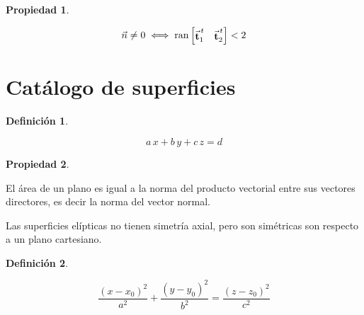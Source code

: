 \documentclass[a5paper,12pt,twoside]{book}
\newtheorem{defn}{{Definición}}[chapter]
\newtheorem{prop}{{Propiedad}}[chapter]
\begin{document}
\begin{mdframed}[style=MyFrame1]
    \begin{prop}
    \end{prop}
    \begin{equation*}
        \Vec{n} \neq 0 \iff \operatorname{ran} \begin{bmatrix} \Vec{\textbf{t}}_1^{\,t} & \Vec{\textbf{t}}_2^{\,t} \end{bmatrix} <2
    \end{equation*}
\end{mdframed}


\section{Catálogo de superficies}

\begin{mdframed}[style=MyFrame1]
    \begin{defn}
    \end{defn}
    \begin{equation*}
        a\,x +b\,y +c\,z = d
    \end{equation*}
\end{mdframed}

\begin{mdframed}[style=MyFrame1]
    \begin{prop}
    \end{prop}
    El área de un plano es igual a la norma del producto vectorial entre sus vectores directores, es decir la norma del vector normal.
\end{mdframed}


Las superficies elípticas no tienen simetría axial, pero son simétricas son respecto a un plano cartesiano.

\begin{mdframed}[style=MyFrame1]
    \begin{defn}
    \end{defn}
    \begin{equation*}
        \frac{(x-x_0)^2}{a^2} + \frac{(y-y_0)^2}{b^2} = \frac{(z-z_0)^2}{c^2}
    \end{equation*}
\end{mdframed}
\end{document}
